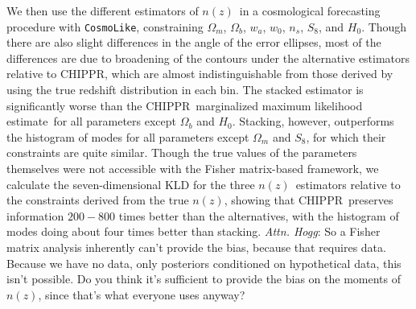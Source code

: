 \documentclass[iop]{emulateapj}
\newcommand{\todo}[3]{{\color{#2}\emph{#1}: #3}}
\newcommand{\aim}[1]{\todo{AIM}{red}{#1}}
\newcommand{\dwh}[1]{\todo{Attn. Hogg}{blue}{#1}}
\newcommand{\project}[1]{\textsc{#1}}
\newcommand{\Chippr}{\project{CHIPPR}}%
\newcommand{\repo}[1]{\texttt{#1}}
\newcommand{\cosmolike}{\repo{CosmoLike}}
\newcommand{\nz}{$n(z)$}
\newcommand{\mmle}{marginalized maximum likelihood estimate}%
\begin{document}
We then use the different estimators of \nz\ in a cosmological forecasting procedure with \cosmolike, constraining $\Omega_{m}$, $\Omega_{b}$, $w_{a}$, $w_{0}$, $n_{s}$, $S_{8}$, and $H_{0}$.
Though there are also slight differences in the angle of the error ellipses, most of the differences are due to broadening of the contours under the alternative estimators relative to \Chippr, which are almost indistinguishable from those derived by using the true redshift distribution in each bin.
The stacked estimator is significantly worse than the \Chippr\ \mmle\ for all parameters except $\Omega_{b}$ and $H_{0}$.
Stacking, however, outperforms the histogram of modes for all parameters except $\Omega_{m}$ and $S_{8}$, for which their constraints are quite similar.
Though the true values of the parameters themselves were not accessible with the Fisher matrix-based framework, we calculate the seven-dimensional KLD for the three \nz\ estimators relative to the constraints derived from the true \nz, showing that \Chippr\ preserves information $200-800$ times better than the alternatives, with the histogram of modes doing about four times better than stacking.
\dwh{So a Fisher matrix analysis inherently can't provide the bias, because that requires data.
Because we have no data, only posteriors conditioned on hypothetical data, this isn't possible.
Do you think it's sufficient to provide the bias on the moments of \nz, since that's what everyone uses anyway?}
\end{document}
